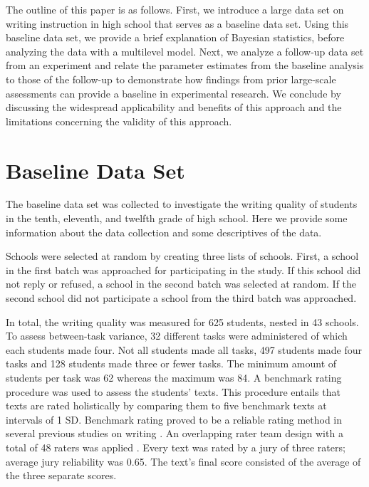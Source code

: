 \documentclass[man, floatsintext]{apa7}
\begin{document}
The outline of this paper is as follows. 
First, we introduce a large data set on writing instruction in high school that serves as a baseline data set. 
Using this baseline data set, we provide a brief explanation of Bayesian statistics, before analyzing the data with a multilevel model. 
Next, we analyze a follow-up data set from an experiment and relate the parameter estimates from the baseline analysis to those of the follow-up to demonstrate how findings from prior large-scale assessments can provide a baseline in experimental research. 
We conclude by discussing the widespread applicability and benefits of this approach and the limitations concerning the validity of this approach.


\section{Baseline Data Set}
\noindent The baseline data set was collected to investigate the writing quality of students in the tenth, eleventh, and twelfth grade of high school. Here we provide some information about the data collection and some descriptives of the data.

Schools were selected at random by creating three lists of schools. First, a school in the first batch was approached for participating in the study. If this school did not reply or refused, a school in the second batch was selected at random. If the second school did not participate a school from the third batch was approached.

In total, the writing quality was measured for 625 students, nested in 43 schools. To assess between-task variance, 32 different tasks were administered of which each students made four. Not all students made all tasks, 497 students made four tasks and 128 students made three or fewer tasks. The minimum amount of students per task was 62 whereas the maximum was 84. 
A benchmark rating procedure was used to assess the students' texts.
This procedure entails that texts are rated holistically by comparing them to five benchmark texts at intervals of 1 SD.
Benchmark rating proved to be a reliable rating method in several previous studies on writing \parencite{blok1986essay, de2016student, rietdijk2017improving,bouwer2017tekster}.
An overlapping rater team design with a total of 48 raters was applied \parencite{vandenbergh1989method}.
Every text was rated by a jury of three raters; average jury reliability was 0.65. The text's final score consisted of the average of the three separate scores.
\end{document}
